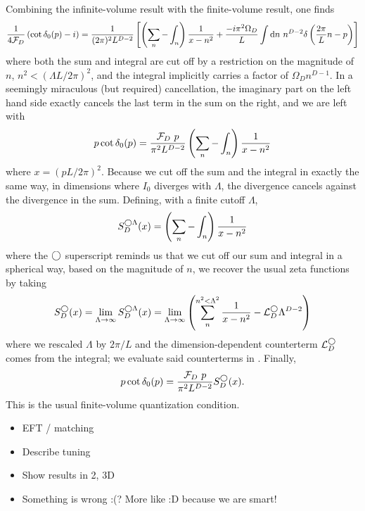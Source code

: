 Combining the infinite-volume result with the finite-volume result, one finds
\begin{equation}
    \frac{1}{4\mathcal{F}_D}\left(\cot \delta_0(p) - i\right) = \frac{1}{(2\pi)^2 L^{D-2}}\left[ \left(\sum_n- \int_n\right) \frac{1}{x-n^2} + \frac{-i \pi^2\Omega_D}{L} \int \mathrm{d}n\ n^{D-2} \delta\left(\frac{2\pi}{L}n - p\right) \right]
\end{equation}
where both the sum and integral are cut off by a restriction on the magnitude of $n$, $n^2 < (\Lambda L / 2\pi)^2$, and the integral implicitly carries a factor of $\Omega_D n^{D-1}$.
In a seemingly miraculous (but required) cancellation, the imaginary part on the left hand side exactly cancels the last term in the sum on the right, and we are left with
\begin{equation}
    p \cot \delta_0(p) = \frac{\mathcal{F}_D\ p}{\pi^2 L^{D-2}} \left(\sum_n-\int_n\right) \frac{1}{x-n^2}
\end{equation}
where $x=(pL/2\pi)^2$.
Because we cut off the sum and the integral in exactly the same way, in dimensions where $I_0$ diverges with $\Lambda$, the divergence cancels against the divergence in the sum.
Defining, with a finite cutoff $\Lambda$,
\begin{equation}\label{eq:spherical cutoff S}
    S^{\bigcirc\Lambda}_D(x) = \left(\sum_n- \int_n\right) \frac{1}{x-n^2}
\end{equation}
where the $\bigcirc$ superscript reminds us that we cut off our sum and integral in a spherical way, based on the magnitude of $n$, we recover the usual \Luscher zeta functions by taking
\begin{equation}
    S^\bigcirc_D(x)
    =
    \lim_{\Lambda\rightarrow\infty} S^{\bigcirc\Lambda}_D(x)
    =
    \lim_{\Lambda\rightarrow\infty}\left( \sum_n^{n^2 < \Lambda^2} \frac{1}{x-n^2} - \mathcal{L}_D^\bigcirc \Lambda^{D-2}\right)
\end{equation}
where we rescaled $\Lambda$ by $2\pi/L$ and the dimension-dependent counterterm $\mathcal{L}_D^\bigcirc$ comes from the integral; we evaluate said counterterms in .
Finally,
\begin{equation}\label{eq:spherical quantization}
    p \cot \delta_0(p) = \frac{\mathcal{F}_D\ p}{\pi^2 L^{D-2}} S^\bigcirc_D(x).
\end{equation}
This is the usual \Luscher finite-volume quantization condition.

\begin{itemize}
    \item EFT / matching
    \item Describe tuning
    \item Show results in 2, 3D
    \item Something is wrong :(?  More like :D because we are smart!
\end{itemize}
